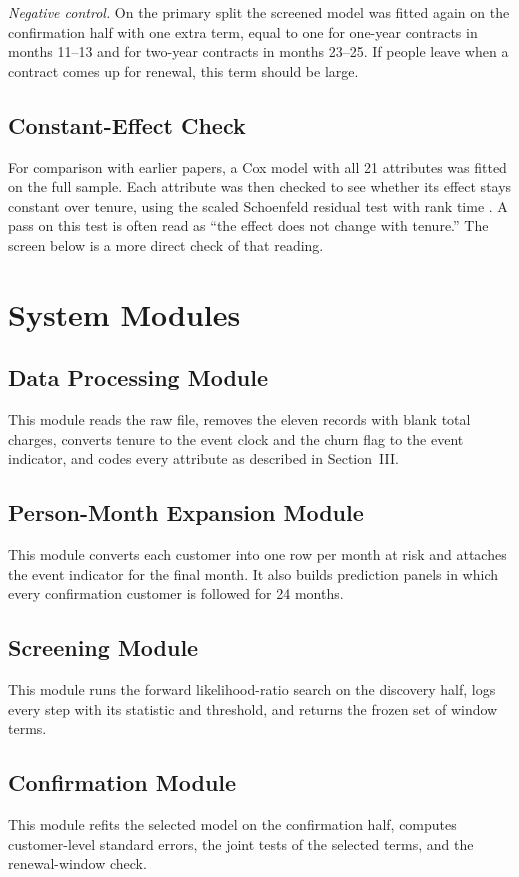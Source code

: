\documentclass[conference]{IEEEtran}
\begin{document}
\textit{Negative control.} On the primary split the screened model was fitted again on the confirmation half with one extra term, equal to one for one-year contracts in months 11--13 and for two-year contracts in months 23--25. If people leave when a contract comes up for renewal, this term should be large.

\subsection{Constant-Effect Check}

For comparison with earlier papers, a Cox model with all 21 attributes was fitted on the full sample. Each attribute was then checked to see whether its effect stays constant over tenure, using the scaled Schoenfeld residual test with rank time \cite{grambsch1994}. A pass on this test is often read as ``the effect does not change with tenure.'' The screen below is a more direct check of that reading.

\section{System Modules}

\subsection{Data Processing Module}
This module reads the raw file, removes the eleven records with blank total charges, converts tenure to the event clock and the churn flag to the event indicator, and codes every attribute as described in Section~III.

\subsection{Person-Month Expansion Module}
This module converts each customer into one row per month at risk and attaches the event indicator for the final month. It also builds prediction panels in which every confirmation customer is followed for 24 months.

\subsection{Screening Module}
This module runs the forward likelihood-ratio search on the discovery half, logs every step with its statistic and threshold, and returns the frozen set of window terms.

\subsection{Confirmation Module}
This module refits the selected model on the confirmation half, computes customer-level standard errors, the joint tests of the selected terms, and the renewal-window check.
\end{document}
